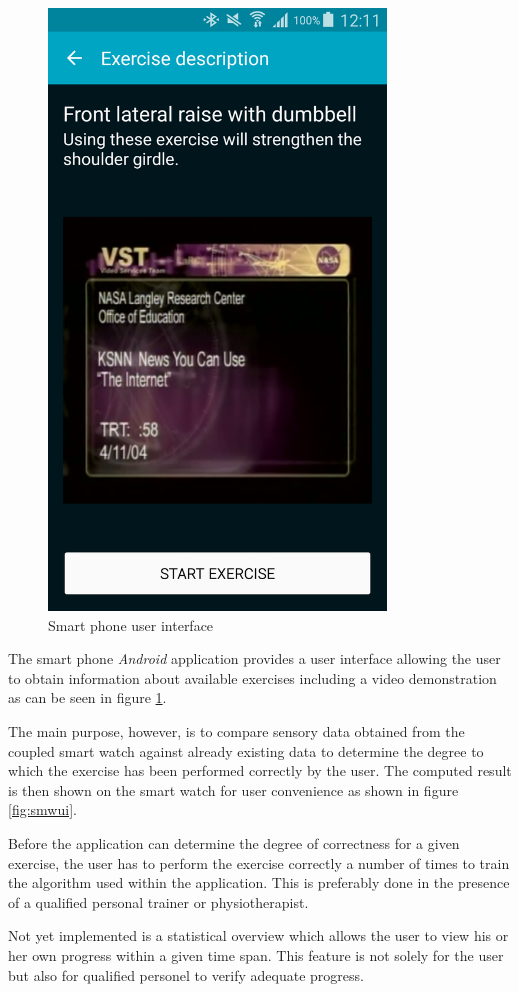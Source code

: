 \begin{figure}[t!]
\begin{minipage}{0.25\textwidth}
        \includegraphics[width=0.80\textwidth]{00_resources/figures/Android_Phone_DescriptionView.png}
    \end{minipage}
  \caption{Smart phone user interface}
  \label{fig:smpui}
\end{figure}

The smart phone \textit{Android} application provides a user interface allowing
the user to obtain information about available exercises including a video
demonstration as can be seen in figure \ref{fig:smpui}.

The main purpose, however, is to compare sensory data obtained from the coupled
smart watch against already existing data to determine the degree to which
the exercise has been performed correctly by the user. The computed result is
then shown on the smart watch for user convenience as shown in figure
\ref{fig:smwui}.

Before the application can determine the degree of correctness for a given
exercise, the user has to perform the exercise correctly a number of times to
train the algorithm used within the application. This is preferably done in
the presence of a qualified personal trainer or physiotherapist.

Not yet implemented is a statistical overview which allows the user to view his
or her own progress within a given time span. This feature is not solely for
the user but also for qualified personel to verify adequate progress.
